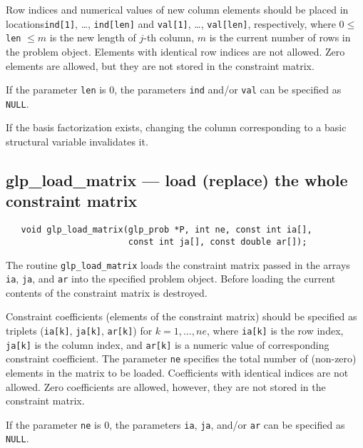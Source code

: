 Row indices and numerical values of new column elements should be
placed in locations\linebreak \verb|ind[1]|, \dots, \verb|ind[len]| and
\verb|val[1]|, \dots, \verb|val[len]|, respectively, where
$0 \leq$ \verb|len| $\leq m$ is the new length of $j$-th column, $m$ is
the current number of rows in the problem object. Elements with
identical row indices are not allowed. Zero elements are allowed, but
they are not stored in the constraint matrix.

If the parameter \verb|len| is 0, the parameters \verb|ind| and/or
\verb|val| can be specified as \verb|NULL|.

\note

If the basis factorization exists, changing the column corresponding
to a basic structural variable invalidates it.

\subsection{glp\_load\_matrix --- load (replace) the whole constraint
matrix}

\synopsis

\begin{verbatim}
   void glp_load_matrix(glp_prob *P, int ne, const int ia[],
                        const int ja[], const double ar[]);
\end{verbatim}

\description

The routine \verb|glp_load_matrix| loads the constraint matrix passed
in  the arrays \verb|ia|, \verb|ja|, and \verb|ar| into the specified
problem object. Before loading the current contents of the constraint
matrix is destroyed.

Constraint coefficients (elements of the constraint matrix) should be
specified as triplets (\verb|ia[k]|, \verb|ja[k]|, \verb|ar[k]|) for
$k=1,\dots,ne$, where \verb|ia[k]| is the row index, \verb|ja[k]| is
the column index, and \verb|ar[k]| is a numeric value of corresponding
constraint coefficient. The parameter \verb|ne| specifies the total
number of (non-zero) elements in the matrix to be loaded. Coefficients
with identical indices are not allowed. Zero coefficients are allowed,
however, they are not stored in the constraint matrix.

If the parameter \verb|ne| is 0, the parameters \verb|ia|, \verb|ja|,
and/or \verb|ar| can be specified as \verb|NULL|.

\note

